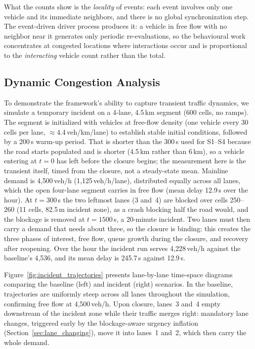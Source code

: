 \documentclass[review,authoryear]{elsarticle}
\begin{document}
What the counts show is the \emph{locality} of events: each event involves only one vehicle and its immediate neighbors, and there is no global synchronization step. The event-driven driver process produces it: a vehicle in free flow with no neighbor near it generates only periodic re-evaluations, so the behavioural work concentrates at congested locations where interactions occur and is proportional to the \emph{interacting} vehicle count rather than the total.


\subsection{Dynamic Congestion Analysis}
\label{sec:exp_incident}

To demonstrate the framework's ability to capture transient traffic dynamics, we simulate a temporary incident on a 4-lane, 4.5\,km segment (600 cells, no ramps). The segment is initialized with vehicles at free-flow density (one vehicle every 30 cells per lane, $\approx$4.4\,veh/km/lane) to establish stable initial conditions, followed by a 200\,s warm-up period. That is shorter than the 300\,s used for S1--S4 because the road starts populated and is shorter (4.5\,km rather than 6\,km), so a vehicle entering at $t = 0$ has left before the closure begins; the measurement here is the transient itself, timed from the closure, not a steady-state mean. Mainline demand is 4{,}500\,veh/h (1{,}125\,veh/h/lane), distributed equally across all lanes, which the open four-lane segment carries in free flow (mean delay 12.9\,s over the hour). At $t = 300$\,s the two leftmost lanes (3 and~4) are blocked over cells 250--260 (11 cells, 82.5\,m incident zone), as a crash blocking half the road would, and the blockage is removed at $t = 1500$\,s, a 20-minute incident. Two lanes must then carry a demand that needs about three, so the closure is binding: this creates the three phases of interest, free flow, queue growth during the closure, and recovery after reopening. Over the hour the incident run serves 4{,}228\,veh/h against the baseline's 4{,}536, and its mean delay is 245.7\,s against 12.9\,s.

Figure~\ref{fig:incident_trajectories} presents lane-by-lane time-space diagrams comparing the baseline (left) and incident (right) scenarios. In the baseline, trajectories are uniformly steep across all lanes throughout the simulation, confirming free flow at 4{,}500\,veh/h. Upon closure, lanes~3 and~4 empty downstream of the incident zone while their traffic merges right: mandatory lane changes, triggered early by the blockage-aware urgency inflation (Section~\ref{sec:lane_changing}), move it into lanes~1 and~2, which then carry the whole demand.
\end{document}
